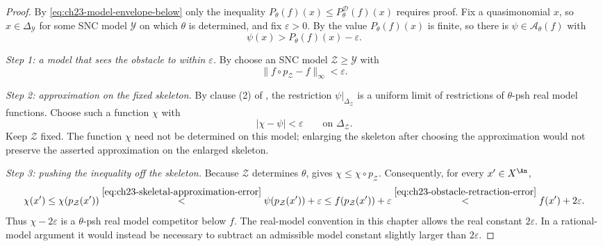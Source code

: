 \begin{proof}
By \eqref{eq:ch23-model-envelope-below} only the inequality
\(P_\theta(f)(x)\leq P^{\mathcal D}_\theta(f)(x)\) requires proof.  Fix a
quasimonomial \(x\), so \(x\in\Delta_{\mathcal Y}\) for some SNC model
\(\mathcal Y\) on which \(\theta\) is determined, and fix \(\varepsilon>0\).
By  the value \(P_\theta(f)(x)\) is finite,
so there is \(\psi\in\mathcal A_\theta(f)\) with
\begin{equation}\label{eq:ch23-competitor-near-x}
 \psi(x)>P_\theta(f)(x)-\varepsilon .
\end{equation}

\emph{Step 1: a model that sees the obstacle to within \(\varepsilon\).}
By  choose an SNC model
\(\mathcal Z\geq\mathcal Y\) with
\begin{equation}\label{eq:ch23-obstacle-retraction-error}
 \|f\circ p_{\mathcal Z}-f\|_\infty<\varepsilon .
\end{equation}

\emph{Step 2: approximation on the fixed skeleton.}
By clause (2) of , the restriction
\(\psi|_{\Delta_{\mathcal Z}}\) is a uniform limit of restrictions of
\(\theta\)-psh real model functions.  Choose such a function \(\chi\)
with
\begin{equation}\label{eq:ch23-skeletal-approximation-error}
 \bigl|\chi-\psi\bigr|<\varepsilon
 \qquad\text{on }\Delta_{\mathcal Z}.
\end{equation}
Keep \(\mathcal Z\) fixed.  The function \(\chi\) need not be determined
on this model; enlarging the skeleton after choosing the approximation
would not preserve the asserted approximation on the enlarged skeleton.

\emph{Step 3: pushing the inequality off the skeleton.}
Because \(\mathcal Z\) determines \(\theta\),
 gives
\(\chi\leq\chi\circ p_{\mathcal Z}\).  Consequently, for every
\(x'\in X^{\An}\),
\[
 \chi(x')\leq\chi(p_{\mathcal Z}(x'))
 \overset{\eqref{eq:ch23-skeletal-approximation-error}}{<}
 \psi(p_{\mathcal Z}(x'))+\varepsilon
 \leq f(p_{\mathcal Z}(x'))+\varepsilon
 \overset{\eqref{eq:ch23-obstacle-retraction-error}}{<}
 f(x')+2\varepsilon.
\]
Thus \(\chi-2\varepsilon\) is a \(\theta\)-psh real model
competitor below \(f\).  The real-model convention in this chapter
allows the real constant \(2\varepsilon\).  In a rational-model
argument it would instead be necessary to subtract an admissible
model constant slightly larger than \(2\varepsilon\).



\end{proof}
